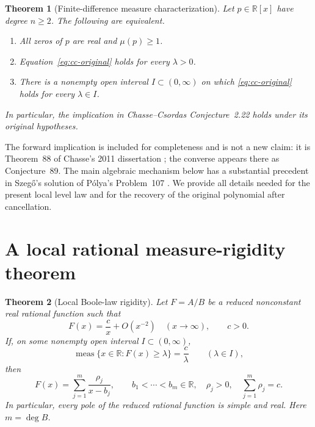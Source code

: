 \documentclass[11pt,a4paper]{article}
\newtheorem{theorem}{Theorem}[section]
\theoremstyle{remark}
\DeclareMathOperator{\meas}{meas}
\begin{document}
\begin{theorem}[Finite-difference measure characterization]
\label{thm:cc}
Let $p\in\mathbb R[x]$ have degree $n\ge2$. The following are equivalent.
\begin{enumerate}
\item All zeros of $p$ are real and $\mu(p)\ge1$.
\item Equation~\eqref{eq:cc-original} holds for every $\lambda>0$.
\item There is a nonempty open interval $I\subset(0,\infty)$ on which
\eqref{eq:cc-original} holds for every $\lambda\in I$.
\end{enumerate}
In particular, the implication in Chasse--Csordas Conjecture~2.22 holds
under its original hypotheses.
\end{theorem}

The forward implication is included for completeness and is not a new
claim: it is Theorem~88 of Chasse's 2011 dissertation
\cite[pp.~45--46]{ChasseThesis}; the converse appears there as
Conjecture~89. The main algebraic mechanism below has a substantial
precedent in Szeg\H{o}'s solution of P\'olya's Problem~107
\cite[pp.~19--20]{Szego1934}. We provide all details needed for the
present local level law and for the recovery of the original polynomial
after cancellation.

\section{A local rational measure-rigidity theorem}
\label{sec:rigidity}

\begin{theorem}[Local Boole-law rigidity]\label{thm:rigidity}
Let $F=A/B$ be a reduced nonconstant real rational function such that
\begin{equation}\label{eq:asymptotic}
 F(x)=\frac c x+O(x^{-2})\quad(x\longrightarrow\infty),\qquad c>0.
\end{equation}
If, on some nonempty open interval $I\subset(0,\infty)$,
\begin{equation}\label{eq:local-boole}
 \meas\{x\in\mathbb R:F(x)\ge\lambda\}=\frac c\lambda
 \qquad(\lambda\in I),
\end{equation}
then
\begin{equation}\label{eq:positive-poles}
 F(x)=\sum_{j=1}^{m}\frac{\rho_j}{x-b_j},\qquad
 b_1<\cdots<b_m\in\mathbb R,\quad
 \rho_j>0,\quad \sum_{j=1}^m\rho_j=c.
\end{equation}
In particular, every pole of the reduced rational function is simple
and real. Here $m=\deg B$.
\end{theorem}
\end{document}
